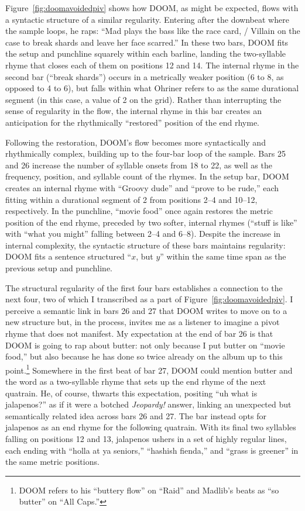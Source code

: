 Figure~\ref{fig:doomavoidedpiv} shows how DOOM, as might be expected, flows with a syntactic structure of a 
similar regularity. Entering after the downbeat where the sample loops, he raps: ``Mad plays the bass like the
race card, / Villain on the case to break shards and leave her face scarred.'' In these two bars, DOOM fits the
setup and punchline squarely within each barline, landing the two-syllable rhyme that closes each of them on 
positions 12 and 14. The internal rhyme in the second bar (``break shards'') occurs in a metrically weaker
position (6 to 8, as opposed to 4 to 6), but falls within what Ohriner refers to as the same durational segment
(in this case, a value of 2 on the grid). Rather than interrupting the sense of regularity in the flow, the 
internal rhyme in this bar creates an anticipation for the rhythmically ``restored'' position of the end rhyme.

Following the restoration, DOOM's flow becomes more syntactically and rhythmically complex, building up to
the four-bar loop of the sample. Bars 25 and 26 increase the number of syllable onsets from 18 to 22, as 
well as the  frequency, position, and syllable count of the rhymes. In the setup bar, DOOM creates an 
internal rhyme with ``Groovy dude'' and ``prove to  be rude,'' each fitting within a durational segment of
2 from positions 2--4 and 10--12, respectively. In the punchline, ``movie food'' once again restores the
metric position of the end rhyme, preceded by two softer, internal rhymes (``stuff is like'' with ``what
you might'' falling between 2--4 and 6--8). Despite the increase in internal complexity, the  syntactic 
structure of these bars maintains regularity: DOOM fits a sentence structured ``$x$, but $y$'' within the
same time span as the previous setup and punchline.

The structural regularity of the first four bars establishes a connection to the next four, two of which I
transcribed as a part of Figure~\ref{fig:doomavoidedpiv}. I perceive a semantic link in bars 26 and 27 that
DOOM writes to move on to a new structure but, in the process, invites me as a listener to imagine a pivot rhyme
that does not manifest. My expectation at the end  of bar 26 is that DOOM is going to rap about butter: not only 
because I put butter on ``movie food,'' but also because he has done so twice already on the album up to this
point.\footnote{
    DOOM refers to his ``buttery flow'' on ``Raid'' and Madlib's beats as ``so butter'' on ``All 
    Caps.''}
Somewhere in the first beat of bar 27, DOOM could mention butter and the word as a two-syllable rhyme that
sets up the end rhyme of the next quatrain. He, of course, thwarts this expectation, positing ``uh\textellipsis
what is jalapenos?'' as if  it were a botched  \textit{Jeopardy!} answer, linking an unexpected but semantically
related idea across bars 26 and 27. The bar instead opts for jalapenos as an end rhyme for the following quatrain.
With its final two syllables falling on positions 12 and 13, jalapenos ushers in a set of highly regular lines,
each ending with ``holla at ya  seniors,'' ``hashish fienda,'' and ``grass is greener'' in the same metric 
positions.

